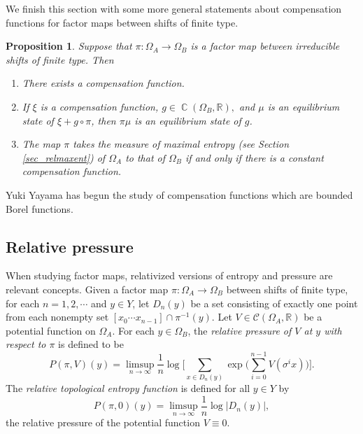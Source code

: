 \documentclass{kepart2010}
\theoremstyle{plain}
\newtheorem{prop}[thm]{Proposition}
\theoremstyle{definition}
\theoremstyle{remark}
\theoremstyle{definition}
\numberwithin{equation}{section}
\begin{document}
We finish this section with some more general statements
about compensation functions for factor maps between shifts
of finite type.

\begin{prop}\label{prop_compfns} \cite{Walters1986}
Suppose that $\pi : \Omega_A \to \Omega_B$ is a factor map between
irreducible shifts of finite type. Then
\begin{enumerate}
\item There exists a compensation function.
\item If $\xi$ is a compensation function, $g\in \operatorname{{\mathbb C}}(\Omega_B,\mathbb
  R),$ and $\mu$ is an equilibrium state of $\xi + g\circ \pi$,
then $\pi \mu$ is an equilibrium state of $g$.
\item The map $\pi$ takes the measure of maximal entropy (see Section
\ref{sec_relmaxent}) of $\Omega_A$ to that
of $\Omega_B$  if and only if there is a
{\em constant} compensation function.
\end{enumerate}
\end{prop}

Yuki Yayama \cite{Yayama2009} has begun the study of
compensation functions which are  bounded Borel functions.

\subsection{Relative pressure}\label{sec_relpressure}

When studying factor maps, relativized versions of entropy and
pressure are relevant concepts. Given a factor map $\pi: \Omega_A
\to \Omega_B$ between shifts of finite type, for each $n = 1, 2,
\cdots$ and $y \in Y$, let $D_n (y)$ be a set consisting of exactly
one point from each nonempty set $[x_0 \cdots x_{n-1}] \cap \pi^{-1}
(y)$. Let $V \in {{\mathcal C}}(\Omega_A, {\mathbb R})$ be a potential function on
$\Omega_A$. For each $y \in \Omega_B$, the {\em relative pressure of
$V$ at $y$ with respect to $\pi$} is defined to be \begin{equation} P(\pi, V)(y)
= \limsup_{n \rightarrow \infty} \frac{1}{n} \log \bigg[ \sum_{x \in
D_n (y)} \exp \Big( \sum_{i=0}^{n-1} V(\sigma^i x) \Big) \bigg]. \end{equation}
The {\em relative topological entropy function} is defined for all
$y \in Y$ by \begin{equation} P (\pi, 0) (y) = \limsup\limits_{n \rightarrow
\infty} \frac{1}{n} \log \big\vert D_n (y) \big\vert, \end{equation} the
relative pressure of the potential function $V \equiv 0$.
\end{document}

